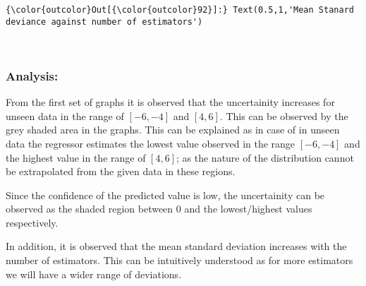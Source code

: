\documentclass[11pt]{article}
\begin{document}
\begin{Verbatim}[commandchars=\\\{\}]
{\color{outcolor}Out[{\color{outcolor}92}]:} Text(0.5,1,'Mean Stanard deviance against number of estimators')
\end{Verbatim}
            
    \begin{center}
    \end{center}
    { \hspace*{\fill} \\}
    
    \subsubsection{Analysis:}\label{analysis}

From the first set of graphs it is observed that the uncertainity
increases for unseen data in the range of \([-6, -4]\) and \([4, 6]\).
This can be observed by the grey shaded area in the graphs. This can be
explained as in case of in unseen data the regressor estimates the
lowest value observed in the range \([-6, -4]\) and the highest value in
the range of \([4, 6]\); as the nature of the distribution cannot be
extrapolated from the given data in these regions.

Since the confidence of the predicted value is low, the uncertainity can
be observed as the shaded region between 0 and the lowest/highest values
respectively.

In addition, it is observed that the mean standard deviation increases
with the number of estimators. This can be intuitively understood as for
more estimators we will have a wider range of deviations.


    
    
    
    
\end{document}
